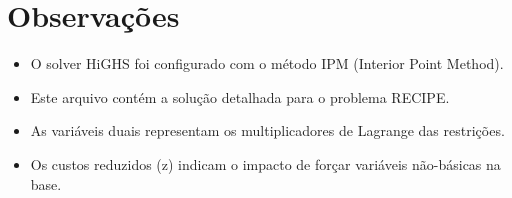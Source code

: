 \documentclass[12pt]{article}
\begin{document}
\begin{longtable}{@{}cc@{}}
\end{longtable}


\section{Observações}

\begin{itemize}
\item O solver HiGHS foi configurado com o método IPM (Interior Point Method).
\item Este arquivo contém a solução detalhada para o problema RECIPE.
\item As variáveis duais representam os multiplicadores de Lagrange das restrições.
\item Os custos reduzidos (z) indicam o impacto de forçar variáveis não-básicas na base.
\end{itemize}
\end{document}
